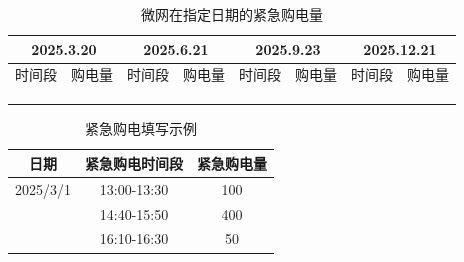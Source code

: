 \begin{table}[htbp]
  \centering
  \caption{微网在指定日期的紧急购电量}
  \label{tab:3}
  \small
  \setlength{\tabcolsep}{4pt}
  \begin{tabular}{|c|c|c|c|c|c|c|c|}
    \hline
    \multicolumn{2}{|c|}{2025.3.20}  & \multicolumn{2}{c|}{2025.6.21} &
    \multicolumn{2}{c|}{2025.9.23}  & \multicolumn{2}{c|}{2025.12.21} \\ \hline
    时间段 & 购电量 & 时间段 & 购电量 & 时间段 & 购电量 & 时间段 & 购电量 \\ \hline
            &        &        &        &        &        &        &        \\ \hline
            &        &        &        &        &        &        &        \\ \hline
            &        &        &        &        &        &        &        \\ \hline
  \end{tabular}
\end{table}


\begin{table}[htbp]
  \centering
  \caption{紧急购电填写示例}
  \label{tab:4}
  \begin{tabular}{|c|c|c|}
    \hline
    日期      & 紧急购电时间段 & 紧急购电量 \\ \hline
    2025/3/1  & 13:00-13:30    & 100        \\ \hline
              & 14:40-15:50    & 400        \\ \hline
              & 16:10-16:30    & 50         \\ \hline
  \end{tabular}
\end{table}

